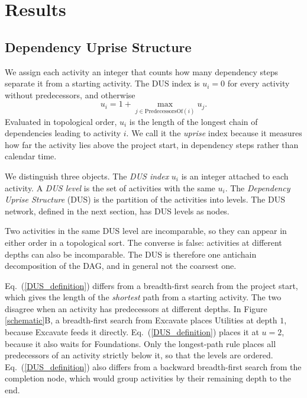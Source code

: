 \documentclass[11pt,a4paper]{article}
\begin{document}
\section*{Results}

\subsection*{Dependency Uprise Structure}

We assign each activity an integer that counts how many dependency steps separate it from a starting activity. The DUS index is $u_i = 0$ for every activity without predecessors, and otherwise
%
\begin{equation}
u_i = 1 + \max_{j\in \text{PredecessorsOf}(i)} u_j.
\label{DUS_definition}
\end{equation}
%
Evaluated in topological order, $u_i$ is the length of the longest chain of dependencies leading to activity $i$. We call it the {\em uprise} index because it measures how far the activity lies above the project start, in dependency steps rather than calendar time.

We distinguish three objects. The {\em DUS index} $u_i$ is an integer attached to each activity. A {\em DUS level} is the set of activities with the same $u_i$. The {\em Dependency Uprise Structure} (DUS) is the partition of the activities into levels. The DUS network, defined in the next section, has DUS levels as nodes.

Two activities in the same DUS level are incomparable, so they can appear in either order in a topological sort. The converse is false: activities at different depths can also be incomparable. The DUS is therefore one antichain decomposition of the DAG, and in general not the coarsest one.

Eq.~(\ref{DUS_definition}) differs from a breadth-first search from the project start, which gives the length of the {\em shortest} path from a starting activity. The two disagree when an activity has predecessors at different depths. In Figure \ref{schematic}B, a breadth-first search from Excavate places Utilities at depth $1$, because Excavate feeds it directly. Eq.~(\ref{DUS_definition}) places it at $u = 2$, because it also waits for Foundations. Only the longest-path rule places all predecessors of an activity strictly below it, so that the levels are ordered. Eq.~(\ref{DUS_definition}) also differs from a backward breadth-first search from the completion node, which would group activities by their remaining depth to the end.
\end{document}
